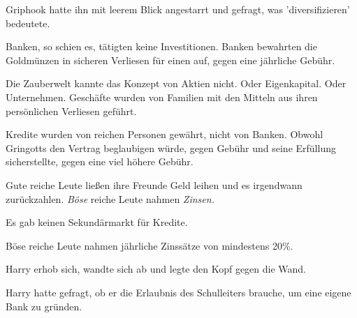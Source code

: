 Griphook hatte ihn mit leerem Blick angestarrt und gefragt, was 'diversifizieren' bedeutete.

Banken, so schien es, tätigten keine Investitionen. Banken bewahrten die Goldmünzen in sicheren Verliesen für einen auf, gegen eine jährliche Gebühr.

Die Zauberwelt kannte das Konzept von Aktien nicht. Oder Eigenkapital. Oder Unternehmen. Geschäfte wurden von Familien mit den Mitteln aus ihren persönlichen Verliesen geführt.

Kredite wurden von reichen Personen gewährt, nicht von Banken. Obwohl Gringotts den Vertrag beglaubigen würde, gegen Gebühr und seine Erfüllung sicherstellte, gegen eine viel höhere Gebühr.

Gute reiche Leute ließen ihre Freunde Geld leihen und es irgendwann zurückzahlen. \emph{Böse} reiche Leute nahmen \emph{Zinsen.}

Es gab keinen Sekundärmarkt für Kredite.

Böse reiche Leute nahmen jährliche Zinssätze von mindestens 20\%.

Harry erhob sich, wandte sich ab und legte den Kopf gegen die Wand.

Harry hatte gefragt, ob er die Erlaubnis des Schulleiters brauche, um eine eigene Bank zu gründen.

